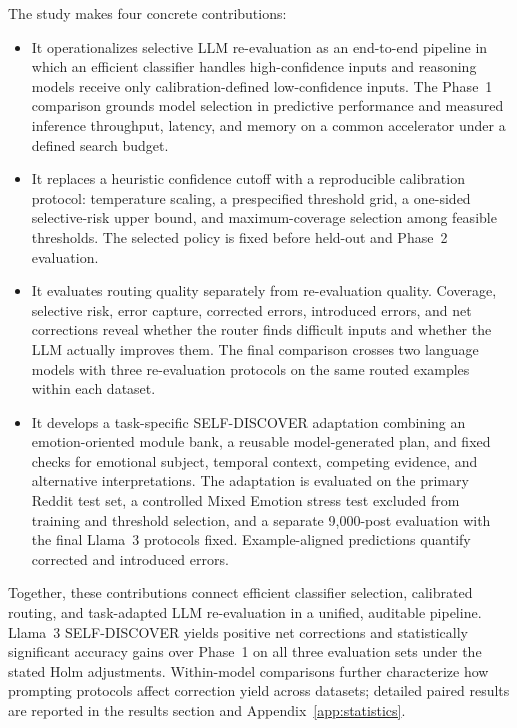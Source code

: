 \documentclass{ieeeaccess}
\begin{document}
The study makes four concrete contributions:
\begin{itemize}
\item It operationalizes selective LLM re-evaluation as an end-to-end pipeline in which an efficient classifier handles high-confidence inputs and reasoning models receive only calibration-defined low-confidence inputs. The Phase~1 comparison grounds model selection in predictive performance and measured inference throughput, latency, and memory on a common accelerator under a defined search budget.
\item It replaces a heuristic confidence cutoff with a reproducible calibration protocol: temperature scaling, a prespecified threshold grid, a one-sided selective-risk upper bound, and maximum-coverage selection among feasible thresholds. The selected policy is fixed before held-out and Phase~2 evaluation.
\item It evaluates routing quality separately from re-evaluation quality. Coverage, selective risk, error capture, corrected errors, introduced errors, and net corrections reveal whether the router finds difficult inputs and whether the LLM actually improves them. The final comparison crosses two language models with three re-evaluation protocols on the same routed examples within each dataset.
\item It develops a task-specific SELF-DISCOVER adaptation \cite{ref18} combining an emotion-oriented module bank, a reusable model-generated plan, and fixed checks for emotional subject, temporal context, competing evidence, and alternative interpretations. The adaptation is evaluated on the primary Reddit test set, a controlled Mixed Emotion stress test excluded from training and threshold selection, and a separate 9,000-post evaluation with the final Llama~3 protocols fixed. Example-aligned predictions quantify corrected and introduced errors.
\end{itemize}

Together, these contributions connect efficient classifier selection, calibrated routing, and task-adapted LLM re-evaluation in a unified, auditable pipeline. Llama~3 SELF-DISCOVER yields positive net corrections and statistically significant accuracy gains over Phase~1 on all three evaluation sets under the stated Holm adjustments. Within-model comparisons further characterize how prompting protocols affect correction yield across datasets; detailed paired results are reported in the results section and Appendix~\ref{app:statistics}.
\end{document}
